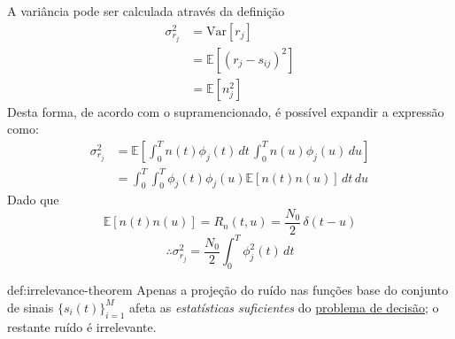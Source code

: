 \noindent A variância pode ser calculada através da definição
\begin{align*}
    \sigma_{r_j}^2 &= \text{Var}[r_j] \\
    &= \mathbb{E}[(r_j - s_{ij})^2] \\
    &= \mathbb{E}[n_j^2] 
\end{align*}
Desta forma, de acordo com o supramencionado, é possível expandir a expressão como:
\begin{align*}
    \sigma_{r_j}^2 &= \mathbb{E}\left[ \int_{0}^{T} n(t) \phi_j(t)\, dt\, \int_{0}^{T} n(u) \phi_j(u)\, du \right] \\
    &= \int_{0}^{T} \int_{0}^{T} \phi_j(t) \phi_j(u) \mathbb{E}[n(t)n(u)] \, dt\,du
\end{align*}
Dado que 
$$
    \mathbb{E}[n(t)n(u)] = R_{n}(t,u) = \frac{N_0}{2}\, \delta(t-u)
$$
$$
    \therefore \sigma_{r_j}^2 = \frac{N_0}{2} \int_{0}^{T} \phi_j^2(t)\, dt
$$
\begin{theo}{def:irrelevance-theorem}\label{def:irrelevance-theorem}
    Apenas a projeção do ruído nas funções base do conjunto de sinais $\{s_i(t)\}_{i=1}^{M}$ afeta as \textit{estatísticas suficientes} do \underline{problema de decisão}; o restante ruído é irrelevante.
\end{theo}

\clearpage
